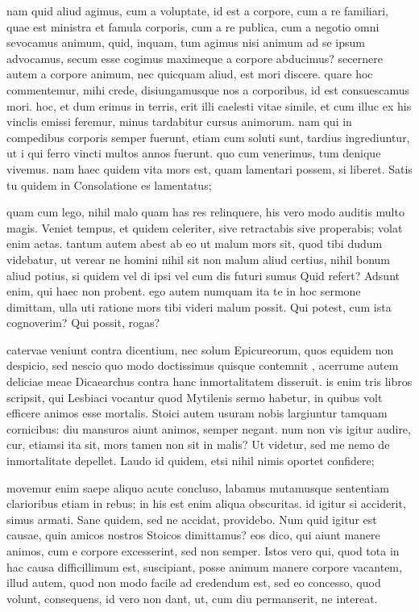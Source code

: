  nam quid aliud agimus, cum a voluptate, id est a corpore, cum a re familiari, quae est ministra et famula corporis, cum a re publica, cum a negotio omni sevocamus animum, quid, inquam, tum agimus nisi animum ad se ipsum advocamus, secum esse cogimus maximeque a corpore abducimus? secernere autem a corpore animum, nec quicquam aliud, est mori discere. quare hoc commentemur, mihi crede, disiungamusque nos a corporibus, id est consuescamus mori. hoc, et dum erimus in terris, erit illi caelesti vitae simile, et cum illuc ex his vinclis emissi feremur, minus tardabitur cursus animorum. nam qui in compedibus corporis semper fuerunt, etiam cum soluti sunt, tardius ingrediuntur, ut i qui ferro vincti multos annos fuerunt. quo cum venerimus, tum denique vivemus. nam haec quidem vita mors est, quam lamentari possem, si liberet. Satis tu quidem in Consolatione es lamentatus;

 quam cum lego, nihil malo quam has res relinquere, his vero modo auditis multo magis. Veniet tempus, et quidem celeriter, sive retractabis sive properabis; volat enim aetas. tantum autem abest ab eo ut malum mors sit, quod tibi dudum videbatur, ut verear ne homini nihil sit non malum aliud certius, nihil bonum aliud potius, si quidem vel di ipsi vel cum dis futuri sumus Quid refert? Adsunt enim, qui haec non probent. ego autem numquam ita te in hoc sermone dimittam, ulla uti ratione mors tibi videri malum possit. Qui potest, cum ista cognoverim? Qui possit, rogas?

 catervae veniunt contra dicentium, nec solum Epicureorum, quos equidem non despicio, sed nescio quo modo doctissimus quisque contemnit , acerrume autem deliciae meae Dicaearchus contra hanc inmortalitatem disseruit. is enim tris libros scripsit, qui Lesbiaci vocantur quod Mytilenis sermo habetur, in quibus volt efficere animos esse mortalis. Stoici autem usuram nobis largiuntur tamquam cornicibus: diu mansuros aiunt animos, semper negant. num non vis igitur audire, cur, etiamsi ita sit, mors tamen non sit in malis? Ut videtur, sed me nemo de inmortalitate depellet. Laudo id quidem, etsi nihil nimis oportet confidere;

 movemur enim saepe aliquo acute concluso, labamus mutamusque sententiam clarioribus etiam in rebus; in his est enim aliqua obscuritas. id igitur si acciderit, simus armati. Sane quidem, sed ne accidat, providebo. Num quid igitur est causae, quin amicos nostros Stoicos dimittamus? eos dico, qui aiunt manere animos, cum e corpore excesserint, sed non semper. Istos vero qui, quod tota in hac causa difficillimum est, suscipiant, posse animum manere corpore vacantem, illud autem, quod non modo facile ad credendum est, sed eo concesso, quod volunt, consequens, id vero non dant, ut, cum diu permanserit, ne intereat.

